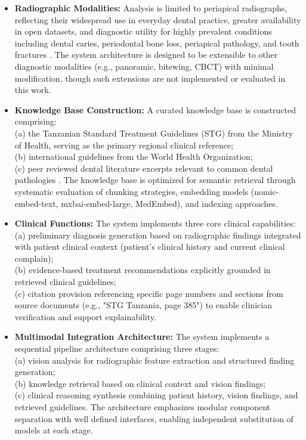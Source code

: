 \documentclass[12pt,a4paper]{report}
\begin{document}
	\begin{itemize}
		\item \textbf{Radiographic Modalities:} Analysis is limited to periapical radiographs, reflecting their widespread use in everyday dental practice, greater availability in open datasets, and diagnostic utility for highly prevalent conditions including dental caries, periodontal bone loss, periapical pathology, and tooth fractures \cite{white_pharoah_radiology,huang2024multimodal_dental,lee2019deep,schwendicke2020artificial}. The system architecture is designed to be extensible to other diagnostic modalities (e.g., panoramic, bitewing, CBCT) with minimal modification, though such extensions are not implemented or evaluated in this work.
		
		\item \textbf{Knowledge Base Construction:} A curated knowledge base is constructed comprising: \\
		(a) the Tanzanian Standard Treatment Guidelines (STG) from the Ministry of Health, serving as the primary regional clinical reference; \\
		(b) international guidelines from the World Health Organization; \\
		(c) peer reviewed dental literature excerpts relevant to common dental pathologies \cite{world2024global,Edward2024OralHealthTZ,tanzania_oral_health_policy}. The knowledge base is optimized for semantic retrieval through systematic evaluation of chunking strategies, embedding models (nomic-embed-text, mxbai-embed-large, MedEmbed), and indexing approaches.
		
		\item \textbf{Clinical Functions:} The system implements three core clinical capabilities: \\
		(a) preliminary diagnosis generation based on radiographic findings integrated with patient clinical context (patient's clinical history and current clinical complain); \\
		(b) evidence-based treatment recommendations explicitly grounded in retrieved clinical guidelines; \\
		(c) citation provision referencing specific page numbers and sections from source documents (e.g., "STG Tanzania, page 385") to enable clinician verification and support explainability.
		
		\item \textbf{Multimodal Integration Architecture:} The system implements a sequential pipeline architecture comprising three stages: \\
		(a) vision analysis for radiographic feature extraction and structured finding generation; \\
		(b) knowledge retrieval based on clinical context and vision findings; \\
		(c) clinical reasoning synthesis combining patient history, vision findings, and retrieved guidelines. The architecture emphasizes modular component separation with well defined interfaces, enabling independent substitution of models at each stage.
		

\end{itemize}
\end{document}
